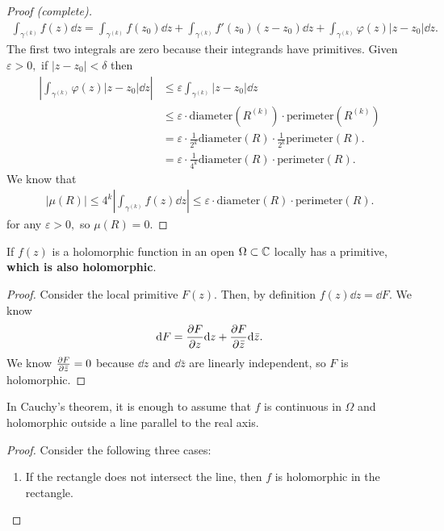 \documentclass[a4paper,12pt]{article}
\begin{document}
\begin{theorem}[Cauchy]
\begin{proof}[Proof (complete)]
\begin{align}
            \int_{\gamma^{(k)}}f(z)\dd z=\int_{\gamma^{(k)}}f(z_0)\dd z+\int_{\gamma^{(k)}}f'(z_0)(z-z_0)\dd z+\int_{\gamma^{(k)}}\varphi(z)|z-z_0|\dd z.
        \end{align}
        The first two integrals are zero because their integrands have primitives. Given $\varepsilon>0,$ if $|z-z_0|<\delta$ then \begin{align}
            \left|\int_{\gamma^{(k)}}\varphi(z)|z-z_0|\dd z\right|&\leq\varepsilon\int_{\gamma^{(k)}}|z-z_0|\dd z\\
            &\leq\varepsilon\cdot\mathrm{diameter}(R^{(k)})\cdot\mathrm{perimeter}(R^{(k)})\\
            &=\varepsilon\cdot\frac{1}{2^k}\mathrm{diameter}(R)\cdot\frac{1}{2^k}\mathrm{perimeter}(R).\\
            &=\varepsilon\cdot\frac{1}{4^k}\mathrm{diameter}(R)\cdot\mathrm{perimeter}(R).
        \end{align}
        We know that \begin{align}
            |\mu(R)|\leq 4^k\left|\int_{\gamma^{(k)}}f(z)\dd z\right|\leq\varepsilon\cdot\mathrm{diameter}(R)\cdot\mathrm{perimeter}(R).
        \end{align}
        for any $\varepsilon>0,$ so $\mu(R)=0.$
    \end{proof}
    \begin{corollary}
        If $f(z)$ is a holomorphic function in an open $\Omega\subset\mathbb{C}$ locally has a primitive, \textbf{which is also holomorphic}.
        \begin{proof}
            Consider the local primitive $F(z).$ Then, by definition $f(z)\dd z=\dd F.$ We know \begin{align}
                \dd F=\partialderivative{F}{z}\dd z+\partialderivative{F}{\bar z}\dd\bar z. 
            \end{align}
            We know $\partialderivative{F}{\bar z}=0$ because $\dd z$ and $\dd\bar z$ are linearly independent, so $F$ is holomorphic.
        \end{proof}
    \end{corollary}
    \begin{corollary}
        In Cauchy's theorem, it is enough to assume that $f$ is continuous in $\Omega$ and holomorphic outside a line parallel to the real axis. \begin{proof}
            Consider the following three cases: \begin{enumerate}
                \item If the rectangle does not intersect the line, then $f$ is holomorphic in the rectangle.

\end{enumerate}
\end{proof}
\end{corollary}
\end{theorem}
\end{document}
